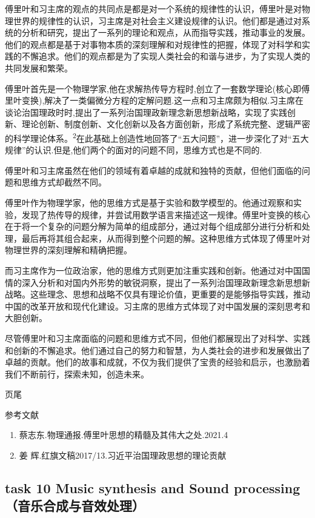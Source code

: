 \documentclass[
]{article}
\begin{document}
傅里叶和习主席的观点的共同点是都是对一个系统的规律性的认识，傅里叶是对物理世界的规律性的认识，习主席是对社会主义建设规律的认识。他们都是通过对系统的分析和研究，提出了一系列的理论和观点，从而指导实践，推动事业的发展。他们的观点都是基于对事物本质的深刻理解和对规律性的把握，体现了对科学和实践的不懈追求。他们的观点都是为了实现人类社会的和谐与进步，为了实现人类的共同发展和繁荣。

傅里叶首先是一个物理学家,他在求解热传导方程时,创立了一套数学理论(核心即傅里叶变换),解决了一类偏微分方程的定解问题.这一点和习主席颇为相似.习主席在谈论治国理政时时,提出了一系列治国理政新理念新思想新战略，实现了实践创新、理论创新、制度创新、文化创新以及各方面创新，形成了系统完整、逻辑严密的科学理论体系。\textsuperscript{2}在此基础上创造性地回答了``五大问题''，进一步深化了对``五大规律''的认识.但是,他们两个的面对的问题不同，思维方式也是不同的.

傅里叶和习主席虽然在他们的领域有着卓越的成就和独特的贡献，但他们面临的问题和思维方式却截然不同。

傅里叶作为物理学家，他的思维方式是基于实验和数学模型的。他通过观察和实验，发现了热传导的规律，并尝试用数学语言来描述这一规律。傅里叶变换的核心在于将一个复杂的问题分解为简单的组成部分，通过对每个组成部分进行分析和处理，最后再将其组合起来，从而得到整个问题的解。这种思维方式体现了傅里叶对物理世界的深刻理解和精确把握。

而习主席作为一位政治家，他的思维方式则更加注重实践和创新。他通过对中国国情的深入分析和对国内外形势的敏锐洞察，提出了一系列治国理政新理念新思想新战略。这些理念、思想和战略不仅具有理论价值，更重要的是能够指导实践，推动中国的改革开放和现代化建设。习主席的思维方式体现了对中国发展的深刻思考和大胆创新。

尽管傅里叶和习主席面临的问题和思维方式不同，但他们都展现出了对科学、实践和创新的不懈追求。他们通过自己的努力和智慧，为人类社会的进步和发展做出了卓越的贡献。他们的故事和成就，不仅为我们提供了宝贵的经验和启示，也激励着我们不断前行，探索未知，创造未来。

页尾

参考文献

\begin{enumerate}
\def\labelenumi{\arabic{enumi}.}
\item
  蔡志东.物理通报.傅里叶思想的精髓及其伟大之处.2021.4
\item
  姜 辉.红旗文稿2017/13.习近平治国理政思想的理论贡献
\end{enumerate}

\subsection{task 10 Music synthesis and Sound
processing（音乐合成与音效处理）}\label{task-10-music-synthesis-and-sound-processingux97f3ux4e50ux5408ux6210ux4e0eux97f3ux6548ux5904ux7406uxff09}
\end{document}
